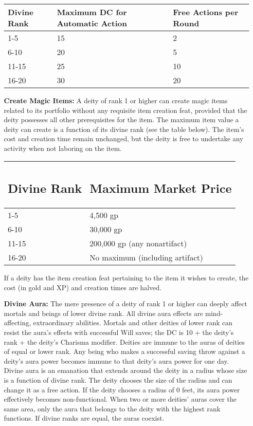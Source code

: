 \documentclass{article}
\begin{document}
\vspace{12pt}
\begin{tabular}{|>{\raggedright}p{56pt}|>{\raggedright}p{96pt}|>{\raggedright}p{69pt}|}
\hline
D\textbf{ivine Rank} & M\textbf{aximum DC for Automatic Action} & F\textbf{ree 
Actions per Round}\tabularnewline
\hline
1-5  & 15 & 2\tabularnewline
\hline
6-10  & 20 & 5\tabularnewline
\hline
11-15  & 25 & 10\tabularnewline
\hline
16-20  & 30 & 20\tabularnewline
\hline
\end{tabular}

\vspace{12pt}
\textbf{Create Magic Items:} A deity of rank 1 or higher can create magic items 
related to its portfolio without any requisite item creation feat, provided that 
the deity possesses all other prerequisites for the item. The maximum item value 
a deity can create is a function of its divine rank (see the table below). The 
item's cost and creation time remain unchanged, but the deity is free to undertake 
any activity when not laboring on the item.

\vspace{12pt}
\begin{tabular}{|>{\raggedright}p{52pt}|>{\raggedright}p{131pt}|}
\hline
\subsection*{D\textbf{ivine Rank}} & \subsection*{M\textbf{aximum Market Price}}\tabularnewline
\hline
1-5  & 4,500 gp\tabularnewline
\hline
6-10  & 30,000 gp\tabularnewline
\hline
11-15  & 200,000 gp (any nonartifact)\tabularnewline
\hline
16-20  & No maximum (including artifact)\tabularnewline
\hline
\end{tabular}

\vspace{12pt}
If a deity has the item creation feat pertaining to the item it wishes to create, 
the cost (in gold and XP) and creation times are halved.

\vspace{12pt}
\textbf{Divine Aura:} The mere presence of a deity of rank 1 or higher can deeply 
affect mortals and beings of lower divine rank. All divine aura effects are mind-affecting, 
extraordinary abilities. Mortals and other deities of lower rank can resist the 
aura's effects with successful Will saves; the DC is 10 + the deity's rank + the 
deity's Charisma modifier. Deities are immune to the auras of deities of equal 
or lower rank. Any being who makes a successful saving throw against a deity's 
aura power becomes immune to that deity's aura power for one day. Divine aura is 
an emanation that extends around the deity in a radius whose size is a function 
of divine rank. The deity chooses the size of the radius and can change it as a 
free action. If the deity chooses a radius of 0 feet, its aura power effectively 
becomes non-functional. When two or more deities' auras cover the same area, only 
the aura that belongs to the deity with the highest rank functions. If divine ranks 
are equal, the auras coexist.
\end{document}
